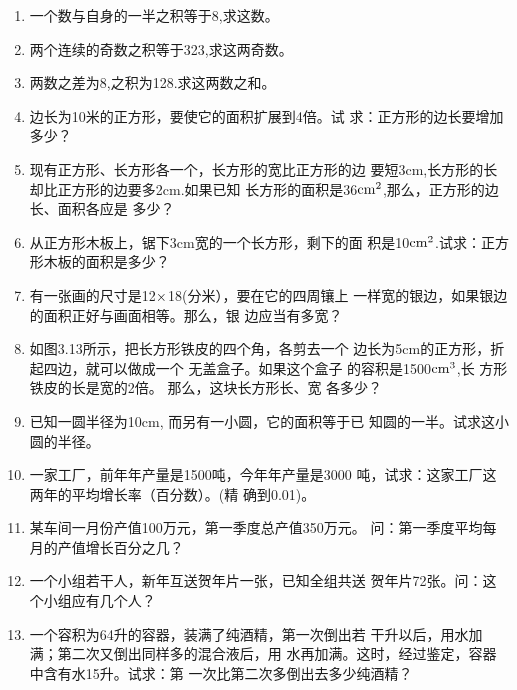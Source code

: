 \begin{enumerate}
\item 一个数与自身的一半之积等于8,求这数。
\item 两个连续的奇数之积等于323,求这两奇数。
\item 两数之差为8,之积为128.求这两数之和。
\item 边长为10米的正方形，要使它的面积扩展到4倍。试
求：正方形的边长要增加多少？
\item 现有正方形、长方形各一个，长方形的宽比正方形的边
要短3cm,长方形的长却比正方形的边要多2cm.如果已知
长方形的面积是36${\rm cm}^2$,那么，正方形的边长、面积各应是
多少？
\item 从正方形木板上，锯下3cm宽的一个长方形，剩下的面
积是10${\rm cm}^2$.试求：正方形木板的面积是多少？
\item 有一张画的尺寸是12$\times$18(分米），要在它的四周镶上
一样宽的银边，如果银边的面积正好与画面相等。那么，银
边应当有多宽？
\item 如图3.13所示，把长方形铁皮的四个角，各剪去一个
边长为5cm的正方形，折
起四边，就可以做成一个
无盖盒子。如果这个盒子
的容积是1500${\rm cm}^3$,长
方形铁皮的长是宽的2倍。
那么，这块长方形长、宽
各多少？
\begin{figure}[htp]
    \centering
{}
    \caption{}
\end{figure}

\item 已知一圆半径为10cm, 而另有一小圆，它的面积等于已
知圆的一半。试求这小圆的半径。
\item 一家工厂，前年年产量是1500吨，今年年产量是3000
吨，试求：这家工厂这两年的平均增长率（百分数）。(精
确到0.01)。
\item 某车间一月份产值100万元，第一季度总产值350万元。
问：第一季度平均每月的产值增长百分之几？
\item 一个小组若干人，新年互送贺年片一张，已知全组共送
贺年片72张。问：这个小组应有几个人？
\item 一个容积为64升的容器，装满了纯酒精，第一次倒出若
干升以后，用水加满；第二次又倒出同样多的混合液后，用
水再加满。这时，经过鉴定，容器中含有水15升。试求：第
一次比第二次多倒出去多少纯酒精？
\end{enumerate}

